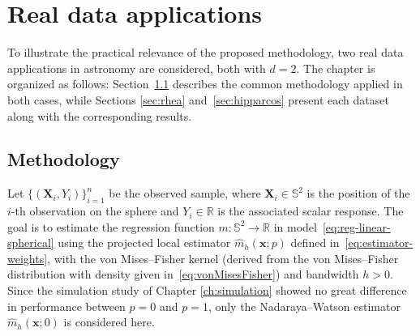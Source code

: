 \documentclass[12pt]{report} %
\newcommand{\bX}{\mathbf{X}}
\newcommand{\bx}{\mathbf{x}}
\begin{document}
\chapter{Real data applications} \label{ch:real-data}

To illustrate the practical relevance of the proposed methodology, two real data applications in astronomy are considered, both with $d = 2$. The chapter is organized as follows: Section~\ref{sec:methodology-rd} describes the common methodology applied in both cases, while Sections \ref{sec:rhea} and~\ref{sec:hipparcos} present each dataset along with the corresponding results.

\section{Methodology} \label{sec:methodology-rd}
Let $\{(\bX_i, Y_i)\}_{i=1}^n$ be the observed sample, where $\bX_i \in \mathbb{S}^2$ is the position of the $i$-th observation on the sphere and $Y_i \in \mathbb{R}$ is the associated scalar response. The goal is to estimate the regression function
$m : \mathbb{S}^2 \to \mathbb{R}$ in model~\eqref{eq:reg-linear-spherical} using the projected local estimator $\hat{m}_{h}(\bx;p)$ defined in~\eqref{eq:estimator-weights}, with the von Mises--Fisher kernel (derived from the von Mises--Fisher distribution with density given in~\eqref{eq:vonMisesFisher}) and bandwidth $h > 0$. Since the simulation study of Chapter \ref{ch:simulation} showed no great difference in performance between $p = 0$ and $p = 1$, only the Nadaraya--Watson estimator $\hat{m}_{h}(\bx;0)$ is considered here.
\end{document}
